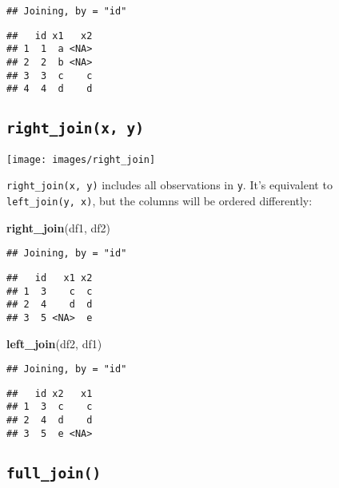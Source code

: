 \documentclass[]{book}
\newenvironment{Shaded}{\begin{snugshade}}{\end{snugshade}}
\newcommand{\KeywordTok}[1]{\textcolor[rgb]{0.13,0.29,0.53}{\textbf{{#1}}}}
\newcommand{\NormalTok}[1]{{#1}}
\begin{document}
\begin{verbatim}
## Joining, by = "id"
\end{verbatim}

\begin{verbatim}
##   id x1   x2
## 1  1  a <NA>
## 2  2  b <NA>
## 3  3  c    c
## 4  4  d    d
\end{verbatim}

\subsection{\texorpdfstring{\texttt{right\_join(x,\ y)}}{right\_join(x, y)}}\label{right_joinx-y}

\texttt{[image: images/right\_join]}

\texttt{right\_join(x,\ y)} includes all observations in \texttt{y}.
It's equivalent to \texttt{left\_join(y,\ x)}, but the columns will be
ordered differently:

\begin{Shaded}
\begin{Highlighting}[]
\KeywordTok{right_join}\NormalTok{(df1, df2)}
\end{Highlighting}
\end{Shaded}

\begin{verbatim}
## Joining, by = "id"
\end{verbatim}

\begin{verbatim}
##   id   x1 x2
## 1  3    c  c
## 2  4    d  d
## 3  5 <NA>  e
\end{verbatim}

\begin{Shaded}
\begin{Highlighting}[]
\KeywordTok{left_join}\NormalTok{(df2, df1)}
\end{Highlighting}
\end{Shaded}

\begin{verbatim}
## Joining, by = "id"
\end{verbatim}

\begin{verbatim}
##   id x2   x1
## 1  3  c    c
## 2  4  d    d
## 3  5  e <NA>
\end{verbatim}

\subsection{\texorpdfstring{\texttt{full\_join()}}{full\_join()}}\label{full_join}
\end{document}
